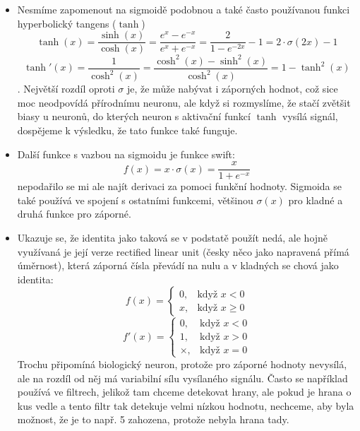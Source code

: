 \documentclass[12pt]{report}			%
\begin{document}
\begin{itemize}
						
					\item Nesmíme zapomenout na sigmoidě podobnou a také často používanou funkci hyperbolický tangens\autocite{Book:FFActivationFunctions} ($\tanh$)
						\begin{equation}\tanh(x) = \frac{\sinh(x)}{\cosh(x)} = \frac{e^x-e^{-x}}{e^x+e^{-x}} = \frac{2}{1-e^{-2x}} - 1 = 2\cdot\sigma(2x)-1\end{equation}										
						\begin{equation}\tanh'(x) = \frac{1}{\cosh^2(x)} = \frac{\cosh^2(x) - \sinh^2(x)}{\cosh^2(x)} = 1-\tanh^2(x)\end{equation}
						. Největší rozdíl oproti $\sigma$ je, že může nabývat i záporných hodnot, což sice moc neodpovídá přírodnímu neuronu, ale když si rozmyslíme, že stačí zvětšit biasy u neuronů, do kterých neuron s aktivační funkcí $\tanh$ vysílá signál, dospějeme k výsledku, že tato funkce také funguje.
						
					\item Další funkce s vazbou na sigmoidu je funkce swift:
						\begin{equation}f(x) = x\cdot \sigma(x) = \frac{x}{1+e^{-x}}\end{equation}										
						nepodařilo se mi ale najít derivaci za pomoci funkční hodnoty. Sigmoida se také používá ve spojení s ostatními funkcemi, většinou $\sigma(x)$ pro kladné a druhá funkce pro záporné.
						
						
					\item Ukazuje se, že identita jako taková se v podstatě použít nedá, ale hojně využívaná je její  verze rectified linear unit (česky něco jako napravená přímá úměrnost), která záporná čísla převádí na nulu a v kladných se chová jako identita:
						\begin{equation}f(x) = \begin{cases}0, & \text{když } x < 0\\x, & \text{když } x \geq 0 \end{cases}\end{equation}
						\begin{equation}f'(x) = \begin{cases}0, & \text{když } x < 0\\1, & \text{když } x > 0 \\\times, & \text{když } x = 0 \end{cases}\end{equation}
						Trochu připomíná biologický neuron, protože pro záporné hodnoty nevysílá, ale na rozdíl od něj má variabilní sílu vysílaného signálu. Často se například používá ve filtrech, jelikož tam chceme detekovat hrany, ale pokud je hrana o kus vedle a tento filtr tak detekuje velmi nízkou hodnotu, nechceme, aby byla možnost, že je to např. 5 zahozena, protože nebyla hrana tady.
						

\end{itemize}
\end{document}
